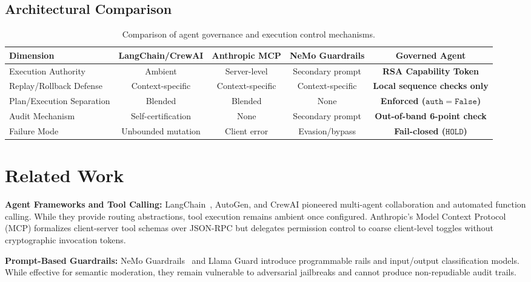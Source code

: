 \documentclass[11pt,a4paper]{article}
\begin{document}
\subsection{Architectural Comparison}

\begin{table}[h]
\centering
\small
\begin{tabular}{@{}lcccc@{}}
\toprule
\textbf{Dimension} & \textbf{LangChain/CrewAI} & \textbf{Anthropic MCP} & \textbf{NeMo Guardrails} & \textbf{Governed Agent} \\
\midrule
Execution Authority & Ambient & Server-level & Secondary prompt & \textbf{RSA Capability Token} \\
Replay/Rollback Defense & Context-specific & Context-specific & Context-specific & \textbf{Local sequence checks only} \\
Plan/Execution Separation & Blended & Blended & None & \textbf{Enforced ($\mathtt{auth=False}$)} \\
Audit Mechanism & Self-certification & None & Secondary prompt & \textbf{Out-of-band 6-point check} \\
Failure Mode & Unbounded mutation & Client error & Evasion/bypass & \textbf{Fail-closed ($\mathtt{HOLD}$)} \\
\bottomrule
\end{tabular}
\caption{Comparison of agent governance and execution control mechanisms.}
\label{tab:comparison}
\end{table}

\section{Related Work}

\textbf{Agent Frameworks and Tool Calling:} LangChain~\cite{chase2022}, AutoGen, and CrewAI pioneered multi-agent collaboration and automated function calling. While they provide routing abstractions, tool execution remains ambient once configured. Anthropic's Model Context Protocol (MCP) formalizes client-server tool schemas over JSON-RPC but delegates permission control to coarse client-level toggles without cryptographic invocation tokens.

\textbf{Prompt-Based Guardrails:} NeMo Guardrails~\cite{rebedea2023} and Llama Guard introduce programmable rails and input/output classification models. While effective for semantic moderation, they remain vulnerable to adversarial jailbreaks and cannot produce non-repudiable audit trails.
\end{document}
